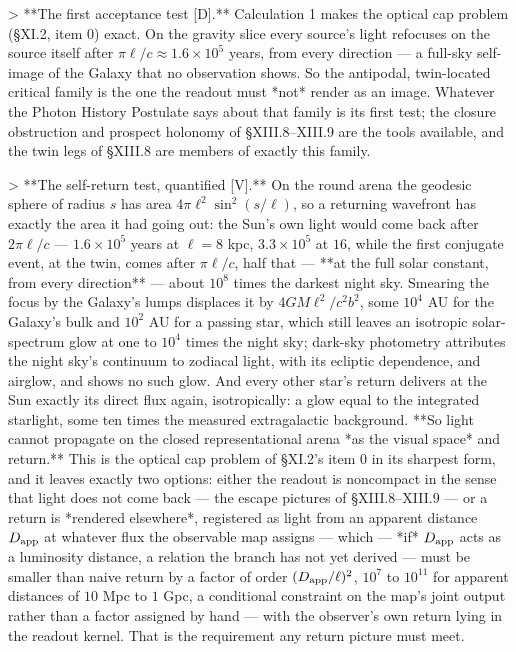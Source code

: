 > **The first acceptance test [D].** Calculation 1 makes the optical cap problem (§XI.2, item 0) exact. On the gravity slice every source's light refocuses on the source itself after $\pi\ell/c\approx1.6\times10^5$ years, from every direction — a full-sky self-image of the Galaxy that no observation shows. So the antipodal, twin-located critical family is the one the readout must *not* render as an image. Whatever the Photon History Postulate says about that family is its first test; the closure obstruction and prospect holonomy of §XIII.8–XIII.9 are the tools available, and the twin legs of §XIII.8 are members of exactly this family.

> **The self-return test, quantified [V].** On the round arena the geodesic sphere of radius $s$ has area $4\pi\ell^2\sin^2(s/\ell)$, so a returning wavefront has exactly the area it had going out: the Sun's own light would come back after $2\pi\ell/c$ — $1.6\times10^5$ years at $\ell = 8$ kpc, $3.3\times10^5$ at $16$, while the first conjugate event, at the twin, comes after $\pi\ell/c$, half that — **at the full solar constant, from every direction** — about $10^8$ times the darkest night sky. Smearing the focus by the Galaxy's lumps displaces it by $4GM\ell^2/c^2b^2$, some $10^4$ AU for the Galaxy's bulk and $10^2$ AU for a passing star, which still leaves an isotropic solar-spectrum glow at one to $10^4$ times the night sky; dark-sky photometry attributes the night sky's continuum to zodiacal light, with its ecliptic dependence, and airglow, and shows no such glow. And every other star's return delivers at the Sun exactly its direct flux again, isotropically: a glow equal to the integrated starlight, some ten times the measured extragalactic background. **So light cannot propagate on the closed representational arena *as the visual space* and return.** This is the optical cap problem of §XI.2's item 0 in its sharpest form, and it leaves exactly two options: either the readout is noncompact in the sense that light does not come back — the escape pictures of §XIII.8–XIII.9 — or a return is *rendered elsewhere*, registered as light from an apparent distance $D_{\rm app}$ at whatever flux the observable map assigns — which — *if* $D_{\rm app}$ acts as a luminosity distance, a relation the branch has not yet derived — must be smaller than naive return by a factor of order $(D_{\rm app}/\ell)^2$, $10^7$ to $10^{11}$ for apparent distances of $10$ Mpc to $1$ Gpc, a conditional constraint on the map's joint output rather than a factor assigned by hand — with the observer's own return lying in the readout kernel. That is the requirement any return picture must meet.

